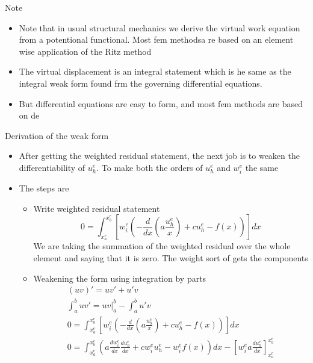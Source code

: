 	\begin{frame}{Note}
		\begin{itemize}
			\item Note that in usual structural mechanics we derive the virtual work equation from a potentional functional. Most fem methodsa re based on an element wise application of the Ritz method
			\item The virtual displacement is an integral statement which is he same as the integral weak form found frm the governing differential equations. 
			\item But differential equations are easy to form, and most fem methods are based on de
			
		\end{itemize}
	\end{frame}


	\begin{frame}{Derivation of the weak form}
		\begin{itemize}
			\item After getting the weighted residual statement, the next job is to weaken the  differentiability of $u_h^e$. To make both the orders of $u_h^e$ and $w_i^e$ the same
			\item The steps are 
			\begin{itemize}
				\item Write weighted residual statement
					\begin{equation}
						0 = \int_{x_a^e}^{x_b^e} \left[w_i^e\left(-\frac{d}{dx}\left(a \frac{u_h^e}{x} \right) + cu_h^e -f(x) \right) \right] dx
					\end{equation}
					We are taking the summation of the weighted residual over the whole element and saying that it is zero. The weight sort of gets the components
				\item Weakening the form using integration by parts
				\begin{equation}
					\begin{aligned}
					(uv)' = uv' + u'v \\
					\int_{a}^{b} uv' = uv|^b_a - \int_{a}^{b} u'v \\
					0 = \int_{x_a^e}^{x_b^e} \left[w_i^e\left(-\frac{d}{dx}\left(a \frac{u_h^e}{x} \right) + cu_h^e -f(x) \right) \right] dx\\
					0 = \int_{x_a^e}^{x_b^e} \left( a\frac{d w_i^e}{dx} \frac{du_h^e}{dx}  + cw^e_iu_h^e -w_i^ef(x) \right)  dx
					-\left[ w_i^e a \frac{du_h^e}{dx}\right]_{x_a^e}^{x_b^e}
					\end{aligned}
				\end{equation}
				
			\end{itemize}
			
		\end{itemize}
	\end{frame}


